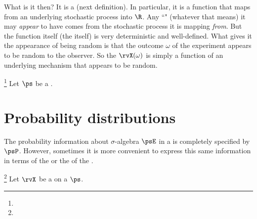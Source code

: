 What is it then? It is a  (next definition).
In particular, it is a function that maps from an underlying stochastic process into $\R$.
Any ``" (whatever that means) it may \emph{appear} to have comes from the stochastic process it
is mapping \emph{from}. But the function itself (the  itself) is very deterministic and well-defined.
What gives it the appearance of being random is that the outcome $\omega$
of the experiment appears to be random to the observer.
So the  $\rvX(\omega)$ is simply a function of an underlying
mechanism that appears to be random.
\begin{definition}
\footnote{
  }
\label{def:randvar}
\label{def:rv}
Let $\ps$ be a  .
\end{definition}

\section{Probability distributions}
The probability information about $\sigma$-algebra $\psE$ in a
  is completely
specified by  $\psP$.
However, sometimes it is more convenient to express this same 
information in terms of the  or the
 of the .
\begin{definition}
\footnote{
  }
\label{def:pdf}
\label{def:cdf}
Let $\rvX$ be a  
on a  $\ps$.
\end{definition}

